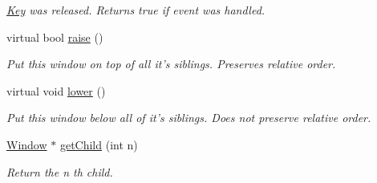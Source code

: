 \begin{DoxyCompactItemize}
\begin{DoxyCompactList}\small\item\em \hyperlink{classGUI_1_1Key}{Key} was released. Returns true if event was handled. \end{DoxyCompactList}\item 
virtual bool \hyperlink{classGUI_1_1Window_a90890951f6ce5f043657756b2691e754}{raise} ()
\begin{DoxyCompactList}\small\item\em Put this window on top of all it's siblings. Preserves relative order. \end{DoxyCompactList}\item 
\hypertarget{classGUI_1_1Window_a56f2e317a40e65fe867084e5531b19bd}{virtual void \hyperlink{classGUI_1_1Window_a56f2e317a40e65fe867084e5531b19bd}{lower} ()}\label{classGUI_1_1Window_a56f2e317a40e65fe867084e5531b19bd}

\begin{DoxyCompactList}\small\item\em Put this window below all of it's siblings. Does not preserve relative order. \end{DoxyCompactList}\item 
\hypertarget{classGUI_1_1Window_a546dab2fb4ebde2b393465a0962eda8f}{\hyperlink{classGUI_1_1Window}{Window} $\ast$ \hyperlink{classGUI_1_1Window_a546dab2fb4ebde2b393465a0962eda8f}{get\-Child} (int n)}\label{classGUI_1_1Window_a546dab2fb4ebde2b393465a0962eda8f}

\begin{DoxyCompactList}\small\item\em Return the {\ttfamily n} th child. \end{DoxyCompactList}\end{DoxyCompactItemize}

